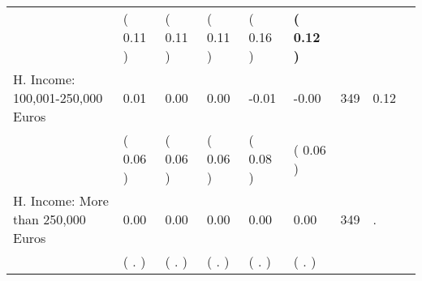 \begin{tabular}{L{6.2cm} C{1.8cm} C{1.8cm} C{1.8cm} C{1.8cm} C{1.8cm} C{1.8cm} C{0.3cm} C{0.3cm}}
 & (     0.11 ) & (     0.11 ) & (     0.11 ) & (     0.16 ) & \textbf{(     0.12 )}  & \\
H. Income: 100,001-250,000 Euros &      0.01 &      0.00 &      0.00 &     -0.01 &     -0.00  & 349 &       0.12 \\ 
 & (     0.06 ) & (     0.06 ) & (     0.06 ) & (     0.08 ) & (     0.06 )  & \\
H. Income: More than 250,000 Euros &      0.00 &      0.00 &      0.00 &      0.00 &      0.00  & 349 &          . \\ 
 & (        . ) & (        . ) & (        . ) & (        . ) & (        . )  & \\
\bottomrule
\end{tabular}

